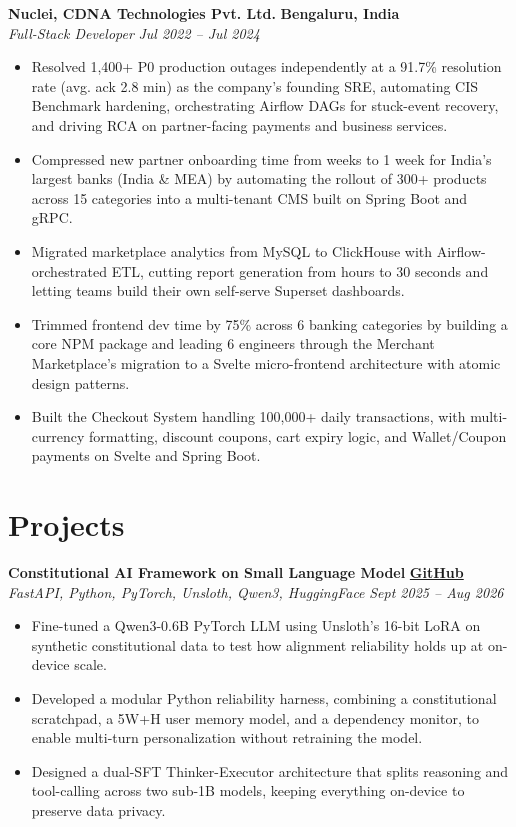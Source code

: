 \documentclass[10pt,letterpaper]{article}
\newcommand{\resumeHeading}[4]{
    {\textbf{#1} \hfill \textbf{#2}} \\[0.5pt]
    {\textit{#3} \hfill \textit{#4}}
}
\begin{document}
\resumeHeading
{Nuclei, CDNA Technologies Pvt. Ltd.}{Bengaluru, India}
{Full-Stack Developer}{Jul 2022 -- Jul 2024}
\begin{itemize}
    \item Resolved 1,400+ P0 production outages independently at a 91.7\% resolution rate (avg. ack 2.8 min) as the company's founding SRE, automating CIS Benchmark hardening, orchestrating Airflow DAGs for stuck-event recovery, and driving RCA on partner-facing payments and business services.
    \item Compressed new partner onboarding time from weeks to 1 week for India's largest banks (India \& MEA) by automating the rollout of 300+ products across 15 categories into a multi-tenant CMS built on Spring Boot and gRPC.
    \item Migrated marketplace analytics from MySQL to ClickHouse with Airflow-orchestrated ETL, cutting report generation from hours to 30 seconds and letting teams build their own self-serve Superset dashboards.
    \item Trimmed frontend dev time by 75\% across 6 banking categories by building a core NPM package and leading 6 engineers through the Merchant Marketplace's migration to a Svelte micro-frontend architecture with atomic design patterns.
    \item Built the Checkout System handling 100,000+ daily transactions, with multi-currency formatting, discount coupons, cart expiry logic, and Wallet/Coupon payments on Svelte and Spring Boot.
\end{itemize}

\section{Projects}

\resumeHeading
{Constitutional AI Framework on Small Language Model}
{\href{https://github.com/AjinkyaTaranekar/trustworthy-personalized-ai}{GitHub}}
{FastAPI, Python, PyTorch, Unsloth, Qwen3, HuggingFace}{Sept 2025 -- Aug 2026}
\begin{itemize}
    \item Fine-tuned a Qwen3-0.6B PyTorch LLM using Unsloth's 16-bit LoRA on synthetic constitutional data to test how alignment reliability holds up at on-device scale.
    \item Developed a modular Python reliability harness, combining a constitutional scratchpad, a 5W+H user memory model, and a dependency monitor, to enable multi-turn personalization without retraining the model.
    \item Designed a dual-SFT Thinker-Executor architecture that splits reasoning and tool-calling across two sub-1B models, keeping everything on-device to preserve data privacy.
\end{itemize}
\end{document}
